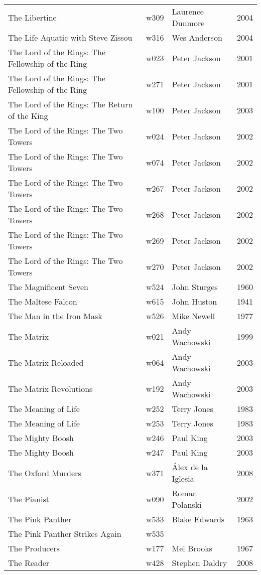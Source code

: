 \documentclass{article}
\begin{document}
\begin {center}
\begin{longtable}{p{10cm} l l l}
The Libertine & w309 & Laurence Dunmore & 2004 \\
The Life Aquatic with Steve Zissou & w316 & Wes Anderson & 2004 \\
The Lord of the Rings: The Fellowship of the Ring & w023 & Peter Jackson & 2001 \\
The Lord of the Rings: The Fellowship of the Ring & w271 & Peter Jackson & 2001 \\
The Lord of the Rings: The Return of the King & w100 & Peter Jackson & 2003 \\
The Lord of the Rings: The Two Towers & w024 & Peter Jackson & 2002 \\
The Lord of the Rings: The Two Towers & w074 & Peter Jackson & 2002 \\
The Lord of the Rings: The Two Towers & w267 & Peter Jackson & 2002 \\
The Lord of the Rings: The Two Towers & w268 & Peter Jackson & 2002 \\
The Lord of the Rings: The Two Towers & w269 & Peter Jackson & 2002 \\
The Lord of the Rings: The Two Towers & w270 & Peter Jackson & 2002 \\
The Magnificent Seven & w524 & John Sturges & 1960 \\
The Maltese Falcon & w615 & John Huston & 1941 \\
The Man in the Iron Mask & w526 & Mike Newell & 1977 \\
The Matrix & w021 & Andy Wachowski & 1999 \\
The Matrix Reloaded & w064 & Andy Wachowski & 2003 \\
The Matrix Revolutions & w192 & Andy Wachowski & 2003 \\
The Meaning of Life & w252 & Terry Jones & 1983 \\
The Meaning of Life & w253 & Terry Jones & 1983 \\
The Mighty Boosh & w246 & Paul King & 2003 \\
The Mighty Boosh & w247 & Paul King & 2003 \\
The Oxford Murders & w371 & Álex de la Iglesia & 2008 \\
The Pianist & w090 & Roman Polanski & 2002 \\
The Pink Panther & w533 & Blake Edwards & 1963 \\
The Pink Panther Strikes Again & w535 &  &  \\
The Producers & w177 & Mel Brooks & 1967 \\
The Reader & w428 & Stephen Daldry & 2008 \\

\end{longtable}
\end{center}
\end{document}
